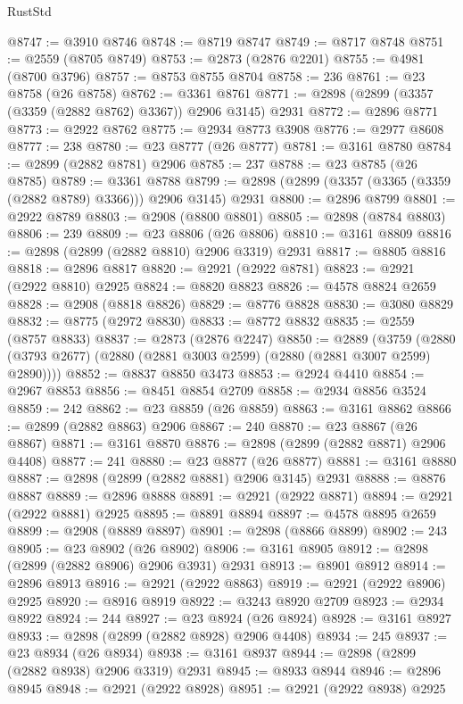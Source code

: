 \begin{lexlean}{RustStd}
\begin{coremodule}
@8747 := @3910 @8746
@8748 := @8719 @8747
@8749 := @8717 @8748
@8751 := @2559 (@8705 @8749)
@8753 := @2873 (@2876 @2201)
@8755 := @4981 (@8700 @3796)
@8757 := @8753 @8755 @8704
@8758 := 236
@8761 := @23 @8758 (@26 @8758)
@8762 := @3361 @8761
@8771 := @2898 (@2899 (@3357 (@3359 (@2882 @8762) @3367)) @2906 @3145) @2931
@8772 := @2896 @8771
@8773 := @2922 @8762
@8775 := @2934 @8773 @3908
@8776 := @2977 @8608
@8777 := 238
@8780 := @23 @8777 (@26 @8777)
@8781 := @3161 @8780
@8784 := @2899 (@2882 @8781) @2906
@8785 := 237
@8788 := @23 @8785 (@26 @8785)
@8789 := @3361 @8788
@8799 := @2898 (@2899 (@3357 (@3365 (@3359 (@2882 @8789) @3366))) @2906 @3145) @2931
@8800 := @2896 @8799
@8801 := @2922 @8789
@8803 := @2908 (@8800 @8801)
@8805 := @2898 (@8784 @8803)
@8806 := 239
@8809 := @23 @8806 (@26 @8806)
@8810 := @3161 @8809
@8816 := @2898 (@2899 (@2882 @8810) @2906 @3319) @2931
@8817 := @8805 @8816
@8818 := @2896 @8817
@8820 := @2921 (@2922 @8781)
@8823 := @2921 (@2922 @8810) @2925
@8824 := @8820 @8823
@8826 := @4578 @8824 @2659
@8828 := @2908 (@8818 @8826)
@8829 := @8776 @8828
@8830 := @3080 @8829
@8832 := @8775 (@2972 @8830)
@8833 := @8772 @8832
@8835 := @2559 (@8757 @8833)
@8837 := @2873 (@2876 @2247)
@8850 := @2889
    (@3759 (@2880 (@3793 @2677) (@2880 (@2881 @3003 @2599) (@2880 (@2881 @3007 @2599) @2890))))
@8852 := @8837 @8850 @3473
@8853 := @2924 @4410
@8854 := @2967 @8853
@8856 := @8451 @8854 @2709
@8858 := @2934 @8856 @3524
@8859 := 242
@8862 := @23 @8859 (@26 @8859)
@8863 := @3161 @8862
@8866 := @2899 (@2882 @8863) @2906
@8867 := 240
@8870 := @23 @8867 (@26 @8867)
@8871 := @3161 @8870
@8876 := @2898 (@2899 (@2882 @8871) @2906 @4408)
@8877 := 241
@8880 := @23 @8877 (@26 @8877)
@8881 := @3161 @8880
@8887 := @2898 (@2899 (@2882 @8881) @2906 @3145) @2931
@8888 := @8876 @8887
@8889 := @2896 @8888
@8891 := @2921 (@2922 @8871)
@8894 := @2921 (@2922 @8881) @2925
@8895 := @8891 @8894
@8897 := @4578 @8895 @2659
@8899 := @2908 (@8889 @8897)
@8901 := @2898 (@8866 @8899)
@8902 := 243
@8905 := @23 @8902 (@26 @8902)
@8906 := @3161 @8905
@8912 := @2898 (@2899 (@2882 @8906) @2906 @3931) @2931
@8913 := @8901 @8912
@8914 := @2896 @8913
@8916 := @2921 (@2922 @8863)
@8919 := @2921 (@2922 @8906) @2925
@8920 := @8916 @8919
@8922 := @3243 @8920 @2709
@8923 := @2934 @8922
@8924 := 244
@8927 := @23 @8924 (@26 @8924)
@8928 := @3161 @8927
@8933 := @2898 (@2899 (@2882 @8928) @2906 @4408)
@8934 := 245
@8937 := @23 @8934 (@26 @8934)
@8938 := @3161 @8937
@8944 := @2898 (@2899 (@2882 @8938) @2906 @3319) @2931
@8945 := @8933 @8944
@8946 := @2896 @8945
@8948 := @2921 (@2922 @8928)
@8951 := @2921 (@2922 @8938) @2925

\end{coremodule}
\end{lexlean}
